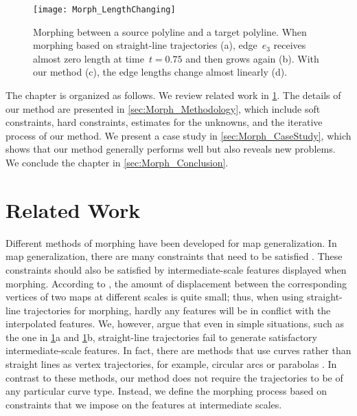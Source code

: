 \begin{figure}[tb]
\centering	
\texttt{[image: Morph\_LengthChanging]}
\caption{Morphing between 
	a source polyline and a target polyline.
	When morphing based on straight-line trajectories (a), 
	edge~$e_3$ receives almost zero length 
	at time~$t=0.75$ and then grows again (b). 
	With our method (c), 
	the edge lengths change almost linearly (d).}
\label{fig:Morph_LengthChanging}
\end{figure}

The chapter is organized as follows. 
We review related work in 
\sect\ref{sec:Morph_RelatedWork}. 
The details of our method are presented in 
\sect\ref{sec:Morph_Methodology}, 
which include soft constraints, hard constraints, 
estimates for the unknowns, 
and the iterative process of our method. 
We present a case study in 
\sect\ref{sec:Morph_CaseStudy}, 
which shows that our 
method generally performs well but also reveals new problems. 
We conclude the chapter in 
\sect\ref{sec:Morph_Conclusion}.

\section{Related Work}
\label{sec:Morph_RelatedWork}

Different methods of morphing 
have been developed for map generalization. 
In map generalization, 
there are many constraints that need to be 
satisfied \parencite{Harrie1999}. 
These constraints should also be satisfied 
by intermediate-scale features displayed when morphing. 
According to \textcite{vanKreveld2001}, 
the amount of displacement 
between the corresponding vertices of two maps 
at different scales is quite small; 
thus, when using straight-line trajectories for morphing, 
hardly any features will be 
in conflict with the interpolated features. 
We, however, argue that even in simple situations, 
such as the one in 
\figs\ref{fig:Morph_LengthChanging}a and 
\ref{fig:Morph_LengthChanging}b, 
straight-line trajectories fail to 
generate satisfactory intermediate-scale features. 
In fact, there are methods that use curves rather than 
straight lines as vertex trajectories, 
for example, circular arcs or parabolas \parencite{Whited2009}. 
In contrast to these methods, our 
method does not require the trajectories to be of any particular 
curve type. 
Instead, we define the morphing process based on constraints 
that we impose on the features at intermediate scales.


